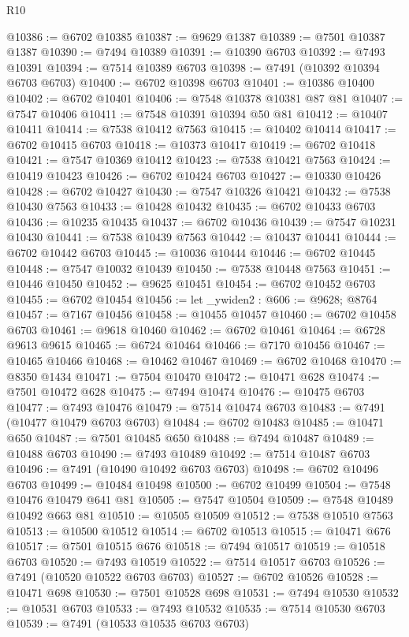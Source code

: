\begin{lexlean}{R10}
\begin{coremodule}
{{{{{{{{{{{{{{{{{{{{{{{{{{{{{{{{{{{{{{{{{{{{{{{{{{{{{{{{{{{{{{{{{{{{{{{{{{{{{{{{{{{{@10386 := @6702 @10385
@10387 := @9629 @1387
@10389 := @7501 @10387 @1387
@10390 := @7494 @10389
@10391 := @10390 @6703
@10392 := @7493 @10391
@10394 := @7514 @10389 @6703
@10398 := @7491 (@10392 @10394 @6703 @6703)
@10400 := @6702 @10398 @6703
@10401 := @10386 @10400
@10402 := @6702 @10401
@10406 := @7548 @10378 @10381 @87 @81
@10407 := @7547 @10406
@10411 := @7548 @10391 @10394 @50 @81
@10412 := @10407 @10411
@10414 := @7538 @10412 @7563
@10415 := @10402 @10414
@10417 := @6702 @10415 @6703
@10418 := @10373 @10417
@10419 := @6702 @10418
@10421 := @7547 @10369 @10412
@10423 := @7538 @10421 @7563
@10424 := @10419 @10423
@10426 := @6702 @10424 @6703
@10427 := @10330 @10426
@10428 := @6702 @10427
@10430 := @7547 @10326 @10421
@10432 := @7538 @10430 @7563
@10433 := @10428 @10432
@10435 := @6702 @10433 @6703
@10436 := @10235 @10435
@10437 := @6702 @10436
@10439 := @7547 @10231 @10430
@10441 := @7538 @10439 @7563
@10442 := @10437 @10441
@10444 := @6702 @10442 @6703
@10445 := @10036 @10444
@10446 := @6702 @10445
@10448 := @7547 @10032 @10439
@10450 := @7538 @10448 @7563
@10451 := @10446 @10450
@10452 := @9625 @10451
@10454 := @6702 @10452 @6703
@10455 := @6702 @10454
@10456 := let _ywiden2 : @606 := @9628; @8764
@10457 := @7167 @10456
@10458 := @10455 @10457
@10460 := @6702 @10458 @6703
@10461 := @9618 @10460
@10462 := @6702 @10461
@10464 := @6728 @9613 @9615
@10465 := @6724 @10464
@10466 := @7170 @10456
@10467 := @10465 @10466
@10468 := @10462 @10467
@10469 := @6702 @10468
@10470 := @8350 @1434
@10471 := @7504 @10470
@10472 := @10471 @628
@10474 := @7501 @10472 @628
@10475 := @7494 @10474
@10476 := @10475 @6703
@10477 := @7493 @10476
@10479 := @7514 @10474 @6703
@10483 := @7491 (@10477 @10479 @6703 @6703)
@10484 := @6702 @10483
@10485 := @10471 @650
@10487 := @7501 @10485 @650
@10488 := @7494 @10487
@10489 := @10488 @6703
@10490 := @7493 @10489
@10492 := @7514 @10487 @6703
@10496 := @7491 (@10490 @10492 @6703 @6703)
@10498 := @6702 @10496 @6703
@10499 := @10484 @10498
@10500 := @6702 @10499
@10504 := @7548 @10476 @10479 @641 @81
@10505 := @7547 @10504
@10509 := @7548 @10489 @10492 @663 @81
@10510 := @10505 @10509
@10512 := @7538 @10510 @7563
@10513 := @10500 @10512
@10514 := @6702 @10513
@10515 := @10471 @676
@10517 := @7501 @10515 @676
@10518 := @7494 @10517
@10519 := @10518 @6703
@10520 := @7493 @10519
@10522 := @7514 @10517 @6703
@10526 := @7491 (@10520 @10522 @6703 @6703)
@10527 := @6702 @10526
@10528 := @10471 @698
@10530 := @7501 @10528 @698
@10531 := @7494 @10530
@10532 := @10531 @6703
@10533 := @7493 @10532
@10535 := @7514 @10530 @6703
@10539 := @7491 (@10533 @10535 @6703 @6703)
}}}}}}}}}}}}}}}}}}}}}}}}}}}}}}}}}}}}}}}}}}}}}}}}}}}}}}}}}}}}}}}}}}}}}}}}}}}}}}}}}}}}
\end{coremodule}
\end{lexlean}
